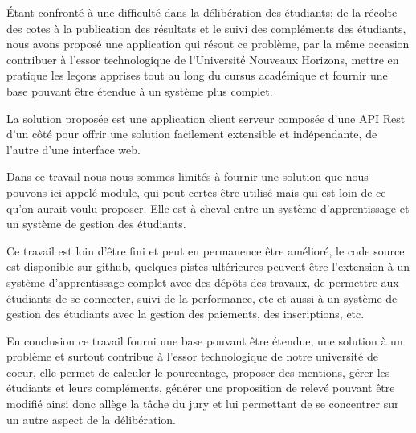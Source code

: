 Étant confronté à une difficulté dans la délibération des étudiants; de la récolte des cotes à la publication des résultats et le suivi des compléments des étudiants, nous avons proposé une application qui résout ce problème, par la même occasion contribuer à l'essor technologique de l'Université Nouveaux Horizons, mettre en pratique les leçons apprises tout au long du cursus académique et fournir une base pouvant être étendue à un système plus complet.

La solution proposée est une application client serveur composée d'une API Rest d'un côté pour offrir une solution facilement extensible et indépendante, de l'autre d'une interface web. 

Dans ce travail nous nous sommes limités à fournir une solution que nous pouvons ici appelé module, qui peut certes être utilisé mais qui est loin de ce qu'on aurait voulu proposer. Elle est à cheval entre un système d'apprentissage et un système de gestion des étudiants.

Ce travail est loin d'être fini et peut en permanence être amélioré, le code source est disponible sur github, quelques pistes ultérieures peuvent être l'extension à un système d'apprentissage complet avec des dépôts des travaux, de permettre aux étudiants de se connecter, suivi de la performance, etc et aussi à un système de gestion des étudiants avec la gestion des paiements, des inscriptions, etc.


En conclusion ce travail fourni une base pouvant être étendue, une solution à un problème et surtout contribue à l'essor technologique de notre université de coeur, elle permet de calculer le pourcentage, proposer des mentions, gérer les étudiants et leurs compléments, générer une proposition de relevé pouvant être modifié ainsi donc allège la tâche du jury et lui permettant de se concentrer sur un autre aspect de la délibération.